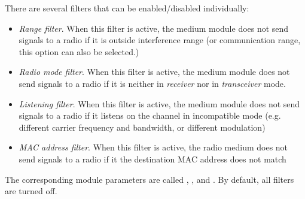 There are several filters that can be enabled/disabled individually:

\begin{itemize}
  \item \textit{Range filter}. When this filter is active, the medium module
    does not send signals to a radio if it is outside interference range 
    (or communication range, this option can also be selected.)
  \item \textit{Radio mode filter}. When this filter is active, 
    the medium module does not send signals to a radio if it is neither 
    in \textit{receiver} nor in \textit{transceiver} mode.
  \item \textit{Listening filter}. When this filter is active, the medium module 
    does not send signals to a radio if it listens on the channel in 
    incompatible mode (e.g. different carrier frequency and bandwidth, 
    or different modulation)
  \item \textit{MAC address filter}. When this filter is active, the radio medium 
    does not send signals to a radio if it the destination MAC address
    does not match
\end{itemize}

The corresponding module parameters are called ,
,  and . 
By default, all filters are turned off.

